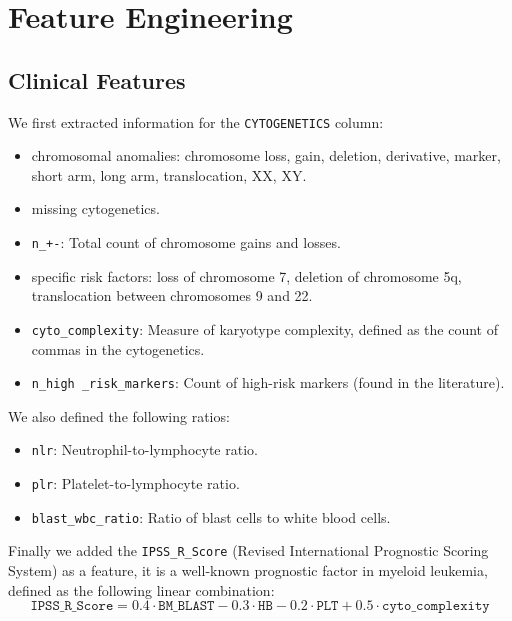 \documentclass{article}
\begin{document}
\section{Feature Engineering}
\subsection{Clinical Features}
We first extracted information for the \texttt{CYTOGENETICS} column:
\begin{itemize}
    \item chromosomal anomalies: chromosome loss, gain, deletion, derivative, marker, short arm, long arm, translocation, XX, XY.
    \item missing cytogenetics.
    \item \texttt{n\_+-}: Total count of chromosome gains and losses.
    \item specific risk factors:  loss of chromosome 7, deletion of chromosome 5q, translocation between chromosomes 9 and 22.
    \item \texttt{cyto\_complexity}: Measure of karyotype complexity, defined as the count of commas in the cytogenetics.
    \item \texttt{n\_high \_risk\_markers}: Count of high-risk markers (found in the literature).
\end{itemize}

We also defined the following ratios:
\begin{itemize}
    \item \texttt{nlr}: Neutrophil-to-lymphocyte ratio.
    \item \texttt{plr}: Platelet-to-lymphocyte ratio.
    \item \texttt{blast\_wbc\_ratio}: Ratio of blast cells to white blood cells.
\end{itemize}

Finally we added the \texttt{IPSS\_R\_Score} (Revised International Prognostic Scoring System) as a feature, it is a well-known prognostic factor in myeloid leukemia, defined as the following linear combination:
\begin{equation}
    \texttt{IPSS_R_Score} = 0.4 \cdot \texttt{BM_BLAST} - 0.3 \cdot \texttt{HB} - 0.2 \cdot \texttt{PLT} + 0.5 \cdot \texttt{cyto_complexity}
\end{equation}
\end{document}
